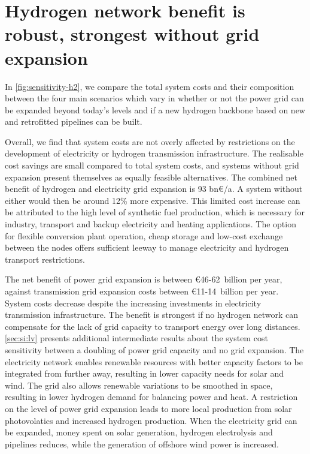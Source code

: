\section*{Hydrogen network benefit is robust, strongest without grid expansion}
\label{sec:h2}

In \cref{fig:sensitivity-h2}, we compare the total system costs and their
composition between the four main scenarios which vary in whether or not the
power grid can be expanded beyond today's levels and if a new hydrogen backbone
based on new and retrofitted pipelines can be built.


Overall, we find that system costs are not overly affected by restrictions on
the development of electricity or hydrogen transmission infrastructure. The
realisable cost savings are small compared to total system costs, and systems
without grid expansion present themselves as equally feasible alternatives. The
combined net benefit of hydrogen and electricity grid expansion is 93 bn\euro/a.
A system without either would then be around 12\% more expensive. This limited
cost increase can be attributed  to the high level of synthetic fuel production,
which is necessary for industry, transport and backup electricity and heating
applications. The option for flexible conversion plant operation, cheap storage
and low-cost exchange between the nodes offers sufficient leeway to manage
electricity and hydrogen transport restrictions.


The net benefit of power grid expansion is between \euro46-62~billion per
year, against transmission grid expansion costs between \euro11-14~billion per
year. System costs decrease despite the increasing investments in electricity
transmission infrastructure. The benefit is strongest if no hydrogen network can
compensate for the lack of grid capacity to transport energy over long
distances. \cref{sec:si:lv} presents additional intermediate results about
the system cost sensitivity between a doubling of power grid capacity and no
grid expansion. The electricity network enables renewable resources with better
capacity factors to be integrated from further away, resulting in lower capacity
needs for solar and wind. The grid also allows renewable variations to be
smoothed in space, resulting in lower hydrogen demand for balancing power and
heat. A restriction on the level of power grid expansion leads to more local
production from solar photovolatics and increased hydrogen production. When the
electricity grid can be expanded, money spent on solar generation, hydrogen
electrolysis and pipelines reduces, while the generation of offshore wind power
is increased.

